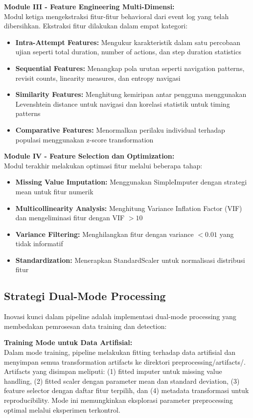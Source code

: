 \textbf{Module III - Feature Engineering Multi-Dimensi:} \\
Modul ketiga mengekstraksi fitur-fitur behavioral dari event log yang telah dibersihkan. Ekstraksi fitur dilakukan dalam empat kategori:
\begin{itemize}
    \item \textbf{Intra-Attempt Features:} Mengukur karakteristik dalam satu percobaan ujian seperti total duration, number of actions, dan step duration statistics
    \item \textbf{Sequential Features:} Menangkap pola urutan seperti navigation patterns, revisit counts, linearity measures, dan entropy navigasi
    \item \textbf{Similarity Features:} Menghitung kemiripan antar pengguna menggunakan Levenshtein distance untuk navigasi dan korelasi statistik untuk timing patterns
    \item \textbf{Comparative Features:} Menormalkan perilaku individual terhadap populasi menggunakan z-score transformation
\end{itemize}

\textbf{Module IV - Feature Selection dan Optimization:} \\
Modul terakhir melakukan optimasi fitur melalui beberapa tahap:
\begin{itemize}
    \item \textbf{Missing Value Imputation:} Menggunakan SimpleImputer dengan strategi mean untuk fitur numerik
    \item \textbf{Multicollinearity Analysis:} Menghitung Variance Inflation Factor (VIF) dan mengeliminasi fitur dengan VIF $> 10$
    \item \textbf{Variance Filtering:} Menghilangkan fitur dengan variance $< 0.01$ yang tidak informatif
    \item \textbf{Standardization:} Menerapkan StandardScaler untuk normalisasi distribusi fitur
\end{itemize}

\subsection{Strategi Dual-Mode Processing}
\label{sec:dualModeStrategy}

Inovasi kunci dalam pipeline adalah implementasi dual-mode processing yang membedakan pemrosesan data training dan detection:

\textbf{Training Mode untuk Data Artifisial:} \\
Dalam mode training, pipeline melakukan fitting terhadap data artifisial dan menyimpan semua transformation artifacts ke direktori preprocessing/artifacts/. Artifacts yang disimpan meliputi: (1) fitted imputer untuk missing value handling, (2) fitted scaler dengan parameter mean dan standard deviation, (3) feature selector dengan daftar fitur terpilih, dan (4) metadata transformasi untuk reproducibility. Mode ini memungkinkan eksplorasi parameter preprocessing optimal melalui eksperimen terkontrol.

